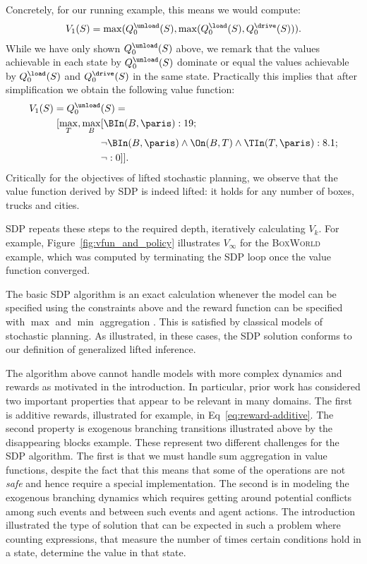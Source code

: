 \begin{enumerate}
  Concretely, for our running example, this means we would compute:
  \begin{align*}
  V_1(S) = \max( Q_0^{\unload}(S), \max( Q_0^{\load}(S), Q_0^{\drive}(S) ) ).
  \end{align*}
  While we have only shown $Q_0^{\unload}(S)$ above, we remark that
  the values achievable in each state by $Q_0^{\unload}(S)$ dominate
  or equal the values achievable by $Q_0^{\load}(S)$ and $Q_0^{\drive}(S)$
  in the same state.  Practically this implies that after simplification
  we obtain the following value function:
  \begin{align*}
    V_1(S) = Q_0^{\unload}&(S) = \\
[\max_T, \max_B & [\BIn(B,\paris):19;  \\
    & \neg \BIn(B,\paris) \land \On(B,T) \land \TIn(T,\paris): 8.1; \\
    & \neg: 0]].    
%
%
%
  \end{align*}
%
%
%
%
%
%
%
%
%
%
%
  Critically for the objectives of lifted
  stochastic planning, we observe that the value function derived by
  SDP is indeed lifted: it holds for any number of boxes, trucks and cities.
  
\end{enumerate}

SDP repeats these steps to the required depth, iteratively calculating 
%
$V_k$.  For example, Figure~\ref{fig:vfun_and_policy} illustrates $V_\infty$
for the \textsc{BoxWorld} example, which was computed by terminating the SDP
loop once the value function converged.

The basic SDP algorithm is an exact calculation whenever the model can
be specified using the constraints above and the reward function can
be specified with $\max$ and $\min$ aggregation \cite{JoshiKeKh11}. 
This is satisfied by
classical models of stochastic planning.  As illustrated, in these cases, the SDP solution conforms to our definition of {generalized lifted inference}.
%
%
%

The algorithm above cannot handle models with more complex dynamics and rewards as motivated in the introduction. In particular, prior work has considered two important properties that appear to be relevant in many domains. The first is additive rewards, illustrated for example, in Eq~\ref{eq:reward-additive}.
The second property is exogenous branching transitions illustrated above by the disappearing blocks example. 
These represent two different challenges for the SDP algorithm. The first is that we must handle sum aggregation in value functions, despite the fact that this means that some of the operations are not {\em safe} and hence require a special implementation. The second is in modeling the exogenous branching dynamics which requires getting around potential conflicts among such events and between such events and agent actions. 
The introduction illustrated the type of solution that can be expected in such a problem where counting expressions, that measure the number of times certain conditions hold in a state, determine the value in that state. 
 

